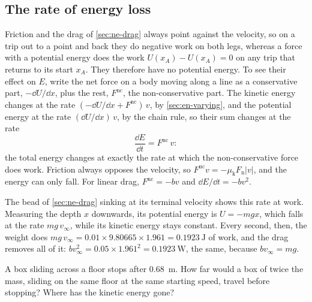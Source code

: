 \subsection*{The rate of energy loss}

Friction and the drag of \cref{sec:ne-drag} always point against the
velocity, so on a trip out to a point and back they do negative work on
both legs, whereas a force with a potential energy does the work $U(x_A)
- U(x_A) = 0$ on any trip that returns to its start $x_A$. They therefore
have no potential energy. To see their effect on $E$, write the net force
on a body moving along a line as a conservative part, $-\dd U/\dd x$,
plus the rest, $F^{\mathrm{nc}}$, the non-conservative part. The kinetic
energy changes at the rate $(-\dd U/\dd x + F^{\mathrm{nc}})\,v$, by
\cref{sec:en-varying}, and the potential energy at the rate $(\dd U/\dd
x)\,v$, by the chain rule, so their sum changes at the rate
\begin{equation}
   \frac{\dd E}{\dd t} = F^{\mathrm{nc}}\,v :
   \label{eq:en-dEdt-1d}
\end{equation}
the total energy changes at exactly the rate at which the
non-conservative force does work. Friction always opposes the velocity,
so $F^{\mathrm{nc}}v = -\mu_{\mathrm{k}}F_{\mathrm{n}}\lvert v\rvert$, and
the energy can only fall. For linear drag, $F^{\mathrm{nc}} = -bv$ and
$\dd E/\dd t = -bv^2$.

The bead of \cref{sec:ne-drag} sinking at its terminal velocity shows
this rate at work. Measuring the depth $x$ downwards, its potential
energy is $U = -mgx$, which falls at the rate $mg\,v_\infty$, while its
kinetic energy stays constant. Every second, then, the weight does
$mg\,v_\infty = 0.01\times9.80665\times1.961 = \SI{0.1923}{\joule}$ of
work, and the drag removes all of it: $bv_\infty^2 = 0.05\times1.961^2 =
\SI{0.1923}{\watt}$, the same, because $bv_\infty = mg$.

\begin{selfcheck}
A box sliding across a floor stops after \SI{0.68}{\metre}. How far would
a box of twice the mass, sliding on the same floor at the same starting
speed, travel before stopping? Where has the kinetic energy gone?
\end{selfcheck}
